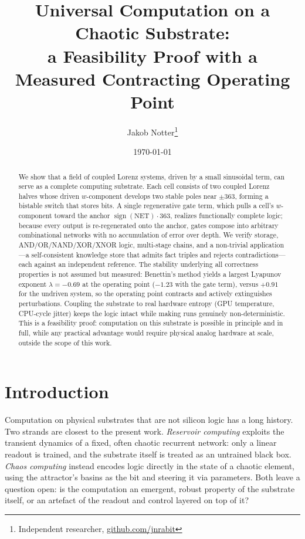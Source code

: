 \documentclass[11pt]{article}
\title{Universal Computation on a Chaotic Substrate:\\ a Feasibility Proof with a Measured Contracting Operating Point}
\author{Jakob Notter\thanks{Independent researcher, \href{https://github.com/jnrabit}{github.com/jnrabit}}}
\date{\today}
\begin{document}
\maketitle

\begin{abstract}
We show that a field of coupled Lorenz systems, driven by a small sinusoidal term, can serve
as a complete computing substrate. Each cell consists of two coupled Lorenz halves whose
driven $w$-component develops two stable poles near $\pm 363$, forming a bistable switch that
stores bits. A single regenerative gate term, which pulls a cell's $w$-component toward the
anchor $\operatorname{sign}(\mathrm{NET})\cdot 363$, realizes functionally complete logic;
because every output is re-regenerated onto the anchor, gates compose into arbitrary
combinational networks with no accumulation of error over depth. We verify storage,
AND/OR/NAND/XOR/XNOR logic, multi-stage chains, and a non-trivial application---a
self-consistent knowledge store that admits fact triples and rejects contradictions---each
against an independent reference. The stability underlying all correctness properties is not
assumed but measured: Benettin's method yields a largest Lyapunov exponent
$\lambda = -0.69$ at the operating point ($-1.23$ with the gate term), versus $+0.91$ for the
undriven system, so the operating point contracts and actively extinguishes perturbations.
Coupling the substrate to real hardware entropy (GPU temperature, CPU-cycle jitter) keeps the
logic intact while making runs genuinely non-deterministic. This is a feasibility proof:
computation on this substrate is possible in principle and in full, while any practical
advantage would require physical analog hardware at scale, outside the scope of this work.
\end{abstract}

\section{Introduction}
Computation on physical substrates that are not silicon logic has a long history. Two strands are
closest to the present work. \emph{Reservoir computing} \cite{jaeger2001,maass2002} exploits the
transient dynamics of a fixed, often chaotic recurrent network: only a linear readout is trained,
and the substrate itself is treated as an untrained black box. \emph{Chaos computing}
\cite{munakata2002,ditto2008} instead encodes logic directly in the state of a chaotic element,
using the attractor's basins as the bit and steering it via parameters. Both leave a question open:
is the computation an emergent, robust property of the substrate itself, or an artefact of the
readout and control layered on top of it?
\end{document}
